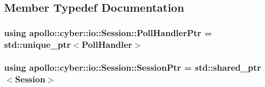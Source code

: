 \subsection{Member Typedef Documentation}
\hypertarget{classapollo_1_1cyber_1_1io_1_1Session_a24c58eb44ed5df020876be84cdb071a5}{
\subsubsection[{Poll\-Handler\-Ptr}]{\setlength{\rightskip}{0pt plus 5cm}using {\bf apollo\-::cyber\-::io\-::\-Session\-::\-Poll\-Handler\-Ptr} =  std\-::unique\-\_\-ptr$<${\bf Poll\-Handler}$>$}}\label{classapollo_1_1cyber_1_1io_1_1Session_a24c58eb44ed5df020876be84cdb071a5}
\hypertarget{classapollo_1_1cyber_1_1io_1_1Session_a1dff3f4dc860a04ae4a7a0c9d0e8de4f}{
\subsubsection[{Session\-Ptr}]{\setlength{\rightskip}{0pt plus 5cm}using {\bf apollo\-::cyber\-::io\-::\-Session\-::\-Session\-Ptr} =  std\-::shared\-\_\-ptr$<${\bf Session}$>$}}\label{classapollo_1_1cyber_1_1io_1_1Session_a1dff3f4dc860a04ae4a7a0c9d0e8de4f}


